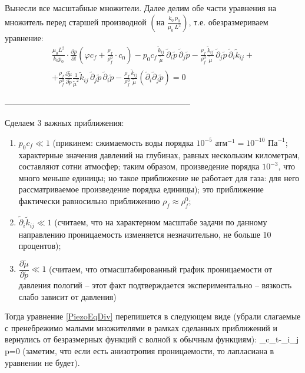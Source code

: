 \documentclass[main.tex]{subfiles}
\begin{document}
Вынесли все масштабные множители. Далее делим обе части уравнения на множитель перед старшей производной $\left(\text{на }\frac{k_0\,p_0}{\mu_0\,L^2}\right)$, т.е. обезразмериваем уравнение:
\begin{multline}\label{PiezoEqDiv}
\frac{\mu_0L^2}{k_0p_0}\cdot\frac{\partial p}{\partial t}\left(\varphi c_f+\frac{\rho_f}{\rho_f^0}\cdot c_\text{п}\right)-p_0c_f\frac{\tilde{k}_{ij}}{\tilde{\mu}}\,\tilde{\partial}_i\tilde{p}\,\tilde{\partial}_j\tilde{p}-\frac{\rho_f}{\rho_f^0}\frac{\tilde{k}_{ij}}{\tilde{\mu}}\,\tilde{\partial}_j\tilde{p}\,\tilde{\partial}_i\tilde{k}_{ij}+\\+\frac{\rho_f}{\rho_f^0}\frac{\partial\tilde{\mu}}{\partial\tilde{p}}\frac{1}{\tilde{\mu}^2}\tilde{k}_{ij}\,\tilde{\partial}_j\tilde{p}\,\tilde{\partial}_i\tilde{p}-\frac{\rho_f}{\rho_f^0}\frac{\tilde{k}_{ij}}{\tilde{\mu}}\left(\tilde{\partial}_i\tilde{\partial}_j\tilde{p}\right)=0
\end{multline}

--------------------------------------------------------------------

Сделаем 3 важных приближения:
\begin{enumerate}
	\item $p_0 c_f\ll 1$ (прикинем: сжимаемость воды порядка $10^{-5}\text{ атм}^{-1}=10^{-10}\text{ Па}^{-1}$; характерные значения давлений на глубинах, равных нескольким километрам, составляют сотни атмосфер; таким образом, произведение порядка $10^{-3}$, что много меньше единицы; но такое приближение не работает для газа: для него рассматриваемое произведение порядка единицы); это приближение фактически равносильно приближению $\rho_f\approx\rho_f^0$;
	\item $\tilde{\partial}_i\tilde{k}_{ij}\ll 1$ (считаем, что на характерном масштабе задачи по данному направлению проницаемость изменяется незначительно, не больше 10 процентов);
	\item $\dfrac{\partial\tilde{\mu}}{\partial\tilde{p}}\ll 1$ (считаем, что отмасштабированный график проницаемости от давления пологий -- этот факт подтверждается экспериментально -- вязкость слабо зависит от давления)
\end{enumerate}

Тогда уравнение \eqref{PiezoEqDiv} перепишется в следующем виде (убрали слагаемые с пренебрежимо малыми множителями в рамках сделанных приближений и вернулись от безразмерных функций с волной к обычным функциям):
\beq
{}_{c_t}-\partial_i\partial_j p=0
\eeq
(заметим, что если есть анизотропия проницаемости, то лапласиана в уравнении не будет).
\end{document}
